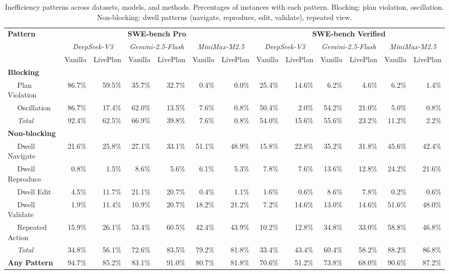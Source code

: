 \begin{table}[h!]
\centering
\small
\setlength{\tabcolsep}{2.5pt}
\caption{Inefficiency patterns across datasets, models, and methods. Percentages of instances with each pattern. Blocking: plan violation, oscillation. Non-blocking: dwell patterns (navigate, reproduce, edit, validate), repeated view.}
\begin{tabular}{l|rrrrrrrrrrrr}
\toprule
\textbf{Pattern} & \multicolumn{6}{c}{\textbf{SWE-bench Pro}} & \multicolumn{6}{c}{\textbf{SWE-bench Verified}} \\
 & \multicolumn{2}{c}{\textit{DeepSeek-V3}} & \multicolumn{2}{c}{\textit{Gemini-2.5-Flash}} & \multicolumn{2}{c}{\textit{MiniMax-M2.5}} & \multicolumn{2}{c}{\textit{DeepSeek-V3}} & \multicolumn{2}{c}{\textit{Gemini-2.5-Flash}} & \multicolumn{2}{c}{\textit{MiniMax-M2.5}} \\
 & \scriptsize Vanilla & \scriptsize LivePlan & \scriptsize Vanilla & \scriptsize LivePlan & \scriptsize Vanilla & \scriptsize LivePlan & \scriptsize Vanilla & \scriptsize LivePlan & \scriptsize Vanilla & \scriptsize LivePlan & \scriptsize Vanilla & \scriptsize LivePlan \\
\midrule
\textbf{Blocking} &  &  &  &  &  &  &  &  &  &  &  &  \\
$\quad$ Plan Violation & 86.7\% & 59.5\% & 35.7\% & 32.7\% & 0.4\% & 0.0\% & 25.4\% & 14.6\% & 6.2\% & 4.6\% & 6.2\% & 1.4\% \\
$\quad$ Oscillation & 86.7\% & 17.4\% & 62.0\% & 13.5\% & 7.6\% & 0.8\% & 50.4\% & 2.0\% & 54.2\% & 21.0\% & 5.0\% & 0.8\% \\
$\quad$ \textit{Total} & 92.4\% & 62.5\% & 66.9\% & 39.8\% & 7.6\% & 0.8\% & 54.0\% & 15.6\% & 55.6\% & 23.2\% & 11.2\% & 2.2\% \\
\cmidrule{1-13}
\textbf{Non-blocking} &  &  &  &  &  &  &  &  &  &  &  &  \\
$\quad$ Dwell Navigate & 21.6\% & 25.8\% & 27.1\% & 33.1\% & 51.1\% & 48.9\% & 15.8\% & 22.8\% & 35.2\% & 31.8\% & 45.6\% & 42.4\% \\
$\quad$ Dwell Reproduce & 0.8\% & 1.5\% & 8.6\% & 5.6\% & 6.1\% & 5.3\% & 7.8\% & 7.6\% & 13.6\% & 12.8\% & 24.2\% & 21.6\% \\
$\quad$ Dwell Edit & 4.5\% & 11.7\% & 21.1\% & 20.7\% & 0.4\% & 1.1\% & 1.6\% & 0.6\% & 8.6\% & 7.8\% & 0.2\% & 0.6\% \\
$\quad$ Dwell Validate & 1.9\% & 11.4\% & 10.9\% & 20.7\% & 18.2\% & 21.2\% & 7.2\% & 14.6\% & 13.0\% & 14.6\% & 51.6\% & 48.0\% \\
$\quad$ Repeated Action & 15.9\% & 26.1\% & 53.4\% & 60.5\% & 42.4\% & 43.9\% & 10.2\% & 12.8\% & 34.8\% & 33.0\% & 58.8\% & 46.8\% \\
$\quad$ \textit{Total} & 34.8\% & 56.1\% & 72.6\% & 83.5\% & 79.2\% & 81.8\% & 33.4\% & 43.4\% & 60.4\% & 58.2\% & 88.2\% & 86.8\% \\
\cmidrule{1-13}
\textbf{Any Pattern} & 94.7\% & 85.2\% & 83.1\% & 91.0\% & 80.7\% & 81.8\% & 70.6\% & 51.2\% & 73.8\% & 68.0\% & 90.6\% & 87.2\% \\
\bottomrule
\end{tabular}
\label{tab:inefficiency_patterns}
\end{table}